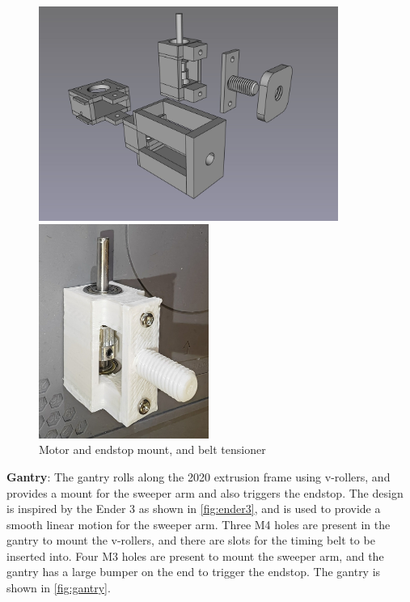 \begin{figure}[H]
    \hfill
    \begin{minipage}[t]{0.45\textwidth}
      \centering
      \includegraphics[height=7cm]{imgs/freecad/motorandtensioner.jpg}
    \end{minipage}
    \hfill
    \begin{minipage}[t]{0.45\textwidth}
      \centering
      \includegraphics[height=7cm]{imgs/freecad/tensionermountreal.jpeg}
    \end{minipage}
    \hfill
    \caption{Motor and endstop mount, and belt tensioner}
    \label{fig:motorandtensioner}
\end{figure}

\textbf{Gantry}: The gantry rolls along the 2020 extrusion frame using v-rollers, and provides a mount for the sweeper arm and also triggers the endstop. The design is inspired by the Ender 3 as shown in \autoref{fig:ender3}, and is used to provide a smooth linear motion for the sweeper arm. Three M4 holes are present in the gantry to mount the v-rollers, and there are slots for the timing belt to be inserted into. Four M3 holes are present to mount the sweeper arm, and the gantry has a large bumper on the end to trigger the endstop. The gantry is shown in \autoref{fig:gantry}.

